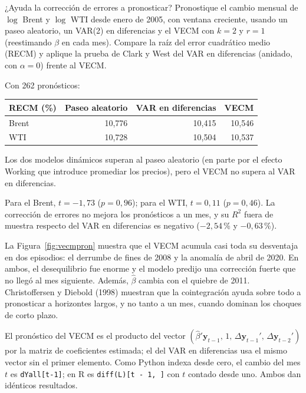 \begin{ejresuelto}{¿Ayuda la corrección de errores a pronosticar?}\label{ej:vecmpron}
\enunciado Pronostique el cambio mensual de $\log$ Brent y $\log$ WTI desde enero de 2005, con ventana creciente,
usando un paseo aleatorio, un VAR(2) en diferencias y el VECM con $k=2$ y $r=1$ (reestimando $\beta$ en cada mes).
Compare la raíz del error cuadrático medio (RECM) y aplique la prueba de Clark y West del VAR en diferencias
(anidado, con $\alpha=0$) frente al VECM.

\solucion
{} Con 262 pronósticos:
\begin{center}\small
\begin{tabular}{@{}lrrr@{}}
\toprule
RECM (\%) & Paseo aleatorio & VAR en diferencias & VECM \\
\midrule
Brent & 10,776 & 10,415 & 10,546 \\
WTI   & 10,728 & 10,504 & 10,537 \\
\bottomrule
\end{tabular}
\end{center}
Los dos modelos dinámicos superan al paseo aleatorio (en parte por el efecto Working que introduce promediar los
precios), pero el VECM no supera al VAR en diferencias.

 Para el Brent, $t=-1{,}73$ ($p=0{,}96$); para el WTI, $t=0{,}11$ ($p=0{,}46$). La
corrección de errores no mejora los pronósticos a un mes, y su $R^2$ fuera de muestra respecto del VAR en
diferencias es negativo ($-2{,}54$\,\% y $-0{,}63$\,\%).

 La Figura~\ref{fig:vecmpron} muestra que el VECM acumula casi toda su desventaja en dos
episodios: el derrumbe de fines de 2008 y la anomalía de abril de 2020. En ambos, el desequilibrio fue enorme y el
modelo predijo una corrección fuerte que no llegó al mes siguiente. Además, $\hat\beta$ cambia con el quiebre de
2011. Christoffersen y Diebold (1998) muestran que la cointegración ayuda sobre todo a pronosticar a horizontes
largos, y no tanto a un mes, cuando dominan los choques de corto plazo.


\RvsPy El pronóstico del VECM es el producto del vector $(\hat\beta'\mathbf y_{t-1},\,1,\,\Delta\mathbf y_{t-1}',\,
\Delta\mathbf y_{t-2}')$ por la matriz de coeficientes estimada; el del VAR en diferencias usa el mismo vector sin el
primer elemento. Como Python indexa desde cero, el cambio del mes $t$ es \texttt{dYall[t-1]}; en R es
\texttt{diff(L)[t - 1, ]} con $t$ contado desde uno. Ambos dan idénticos resultados.


\end{ejresuelto}
